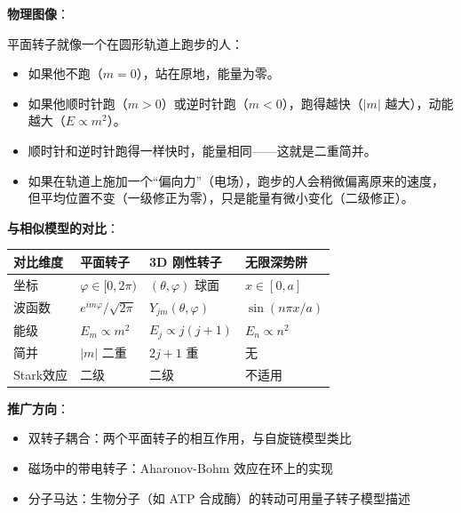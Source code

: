 \begin{insightbox}[物理图像与模型关联]
\textbf{物理图像}：

平面转子就像一个在圆形轨道上跑步的人：
\begin{itemize}[nosep]
    \item 如果他不跑（$m=0$），站在原地，能量为零。
    \item 如果他顺时针跑（$m>0$）或逆时针跑（$m<0$），跑得越快（$|m|$ 越大），动能越大（$E\propto m^2$）。
    \item 顺时针和逆时针跑得一样快时，能量相同——这就是二重简并。
    \item 如果在轨道上施加一个``偏向力''（电场），跑步的人会稍微偏离原来的速度，但平均位置不变（一级修正为零），只是能量有微小变化（二级修正）。
\end{itemize}

\textbf{与相似模型的对比}：
\begin{center}
\begin{tabular}{llll}
\toprule
\textbf{对比维度} & \textbf{平面转子} & \textbf{3D 刚性转子} & \textbf{无限深势阱} \\
\midrule
坐标 & $\varphi\in[0,2\pi)$ & $(\theta,\varphi)$ 球面 & $x\in[0,a]$ \\
波函数 & $e^{im\varphi}/\sqrt{2\pi}$ & $Y_{jm}(\theta,\varphi)$ & $\sin(n\pi x/a)$ \\
能级 & $E_m\propto m^2$ & $E_j\propto j(j+1)$ & $E_n\propto n^2$ \\
简并 & $|m|$ 二重 & $2j+1$ 重 & 无 \\
Stark效应 & 二级 & 二级 & 不适用 \\
\bottomrule
\end{tabular}
\end{center}

\textbf{推广方向}：
\begin{itemize}[nosep]
    \item 双转子耦合：两个平面转子的相互作用，与自旋链模型类比
    \item 磁场中的带电转子：Aharonov-Bohm 效应在环上的实现
    \item 分子马达：生物分子（如 ATP 合成酶）的转动可用量子转子模型描述
\end{itemize}
\end{insightbox}

